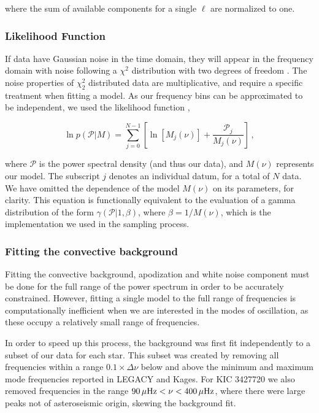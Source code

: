 \documentclass[12pt]{article}
\newcommand{\dnu}{\mbox{$\Delta \nu$}\xspace}
\begin{document}
\noindent where the sum of available components for a single $\ell$ are normalized to one.

\subsubsection{Likelihood Function}\label{sec:like}
If data have Gaussian noise in the time domain, they will appear in the frequency domain with noise following a $\chi^2$ distribution with two degrees of freedom \cite[$\chi^2_2$ hereafter][]{woodard1984}. The noise properties of $\chi^2_2$ distributed data are multiplicative, and require a specific treatment when fitting a model. As our frequency bins can be approximated to be independent, we used the likelihood function \cite{anderson+1990},

\begin{equation}
	\ln p(\mathcal{P} | M) = \sum_{j=0}^{N-1} \left[\ln[M_j(\nu)] + \frac{\mathcal{P}_j}{M_j(\nu)}\right]\, , 
\end{equation}

\noindent where $\mathcal{P}$ is the power spectral density (and thus our data), and $M(\nu)$ represents our model. The subscript $j$ denotes an individual datum, for a total of $N$ data. We have omitted the dependence of the model $M(\nu)$ on its parameters, for clarity. This equation is functionally equivalent to the evaluation of a gamma distribution of the form $\gamma(\mathcal{P} | 1, \beta)$, where $\beta = 1/M(\nu)$, which is the implementation we used in the sampling process.

\subsubsection{Fitting the convective background}\label{sec:background}
Fitting the convective background, apodization and white noise component must be done for the full range of the power spectrum in order to be accurately constrained. However, fitting a single model to the full range of frequencies is computationally inefficient when we are interested in the modes of oscillation, as these occupy a relatively small range of frequencies.

In order to speed up this process, the background was first fit independently to a subset of our data for each star. This subset was created by removing all frequencies within a range $0.1 \times \dnu$ below and above the minimum and maximum mode frequencies reported in LEGACY and Kages. For KIC 3427720 we also removed frequencies in the range $90\, \mu\rm{Hz} < \nu < 400\, \mu{\rm{Hz}}$, where there were large peaks not of asteroseismic origin, skewing the background fit.
\end{document}
